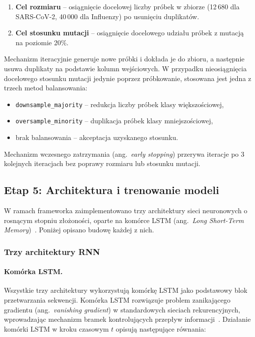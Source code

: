 \begin{enumerate}
    \item \textbf{Cel rozmiaru} -- osiągnięcie docelowej liczby próbek w zbiorze (12\,680 dla SARS-CoV-2, 40\,000 dla Influenzy) po usunięciu duplikatów.
    \item \textbf{Cel stosunku mutacji} -- osiągnięcie docelowego udziału próbek z mutacją na poziomie 20\%.
\end{enumerate}

Mechanizm iteracyjnie generuje nowe próbki i dokłada je do zbioru, a następnie usuwa duplikaty na podstawie kolumn wejściowych. W przypadku nieosiągnięcia docelowego stosunku mutacji jedynie poprzez próbkowanie, stosowana jest jedna z trzech metod balansowania:

\begin{itemize}
    \item \texttt{downsample\_majority} -- redukcja liczby próbek klasy większościowej,
    \item \texttt{oversample\_minority} -- duplikacja próbek klasy mniejszościowej,
    \item brak balansowania -- akceptacja uzyskanego stosunku.
\end{itemize}

Mechanizm wczesnego zatrzymania (ang.~\emph{early stopping}) przerywa iteracje po 3 kolejnych iteracjach bez poprawy rozmiaru lub stosunku mutacji.

\subsection{Etap 5: Architektura i trenowanie modeli}
\label{subsec:architektury}

W ramach frameworka zaimplementowano trzy architektury sieci neuronowych o rosnącym stopniu złożoności, oparte na komórce LSTM (ang.~\emph{Long Short-Term Memory})~\cite{hochreiter1997lstm}. Poniżej opisano budowę każdej z nich.

\subsubsection{Trzy architektury RNN}
\label{subsubsec:modele}

\paragraph{Komórka LSTM.}
Wszystkie trzy architektury wykorzystują komórkę LSTM jako podstawowy blok przetwarzania sekwencji. Komórka LSTM rozwiązuje problem zanikającego gradientu (ang.~\emph{vanishing gradient}) w standardowych sieciach rekurencyjnych, wprowadzając mechanizm bramek kontrolujących przepływ informacji~\cite{hochreiter1997lstm}. Działanie komórki LSTM w kroku czasowym $t$ opisują następujące równania:

